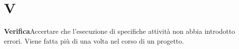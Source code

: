 \newpage
\section{V}\label{l:V}
\textbf{Verifica}\newline Accertare che l’esecuzione di specifiche attività non abbia introdotto errori. Viene fatta più di una volta nel corso di un progetto.